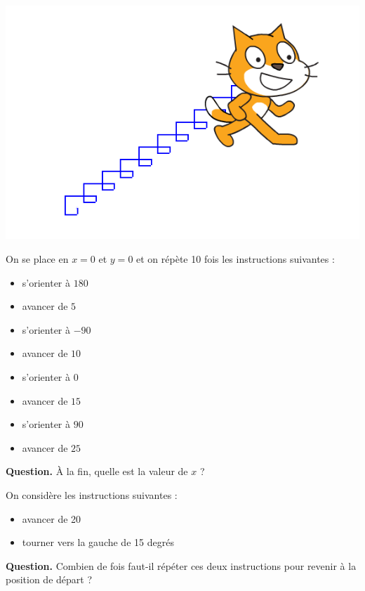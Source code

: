 \documentclass[class=report,crop=false, 12pt]{standalone}
\begin{document}

\begin{enigme}
\sauteligne

\begin{center}
  \includegraphics[scale=\scaleecran]{ecran-02-eg1}
\end{center}

On se place en $x=0$ et $y=0$ et on répète 10 fois les instructions suivantes :
\begin{itemize}
  \item s’orienter à $180$\textdegree
  \item avancer de $5$
  \item s’orienter à $-90$\textdegree 
  \item avancer de $10$
  \item s’orienter à $0$\textdegree
  \item avancer de $15$
  \item s’orienter à $90$\textdegree
  \item avancer de $25$
\end{itemize}

\bigskip

\textbf{Question.} À la fin, quelle est la valeur de $x$ ? 


\end{enigme}



\begin{enigme}
On considère les instructions suivantes :
\begin{itemize}
  \item avancer de 20
  \item tourner vers la gauche de 15 degrés
\end{itemize}

\bigskip

\textbf{Question.} Combien de fois faut-il répéter ces deux instructions pour revenir à la position de départ ? 


\end{enigme}
\end{document}
